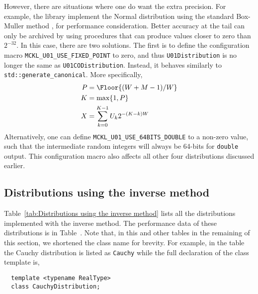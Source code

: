 However, there are situations where one do want the extra precision. For
example, the library implement the Normal distribution using the standard
Box-Muller method \parencite{Box:1958hv}, for performance consideration. Better
accuracy at the tail can only be archived by using procedures that can produce
values closer to zero than $2^{-32}$. In this case, there are two solutions.
The first is to define the configuration macro
\verb|MCKL_U01_USE_FIXED_POINT| to zero, and thus \verb|U01Distribution| is no
longer the same as \verb|U01CODistribution|. Instead, it behaves similarly to
\verb|std::generate_canonical|. More specifically,
\begin{align*}
  P &= \Floor{(W + M - 1) / W} \\
  K &= \max\{1, P\} \\
  X &= \sum_{k=0}^{K - 1} U_k 2^{-(K - k)W}
\end{align*}
Alternatively, one can define \verb|MCKL_U01_USE_64BITS_DOUBLE| to a non-zero
value, such that the intermediate random integers will always be 64-bits for
\verb|double| output. This configuration macro also affects all other four
distributions discussed earlier.

\subsection{Distributions using the inverse method}
\label{sub:Distributions using the inverse method}

Table~\ref{tab:Distributions using the inverse method} lists all the
distributions implemented with the inverse method. The performance data of
these distributions is in Table~. Note that, in this and other tables in the remaining of
this section, we shortened the class name for brevity. For example, in the
table the Cauchy distribution is listed as \verb|Cauchy| while the full
declaration of the class template is,
\begin{Verbatim}
  template <typename RealType>
  class CauchyDistribution;
\end{Verbatim}

